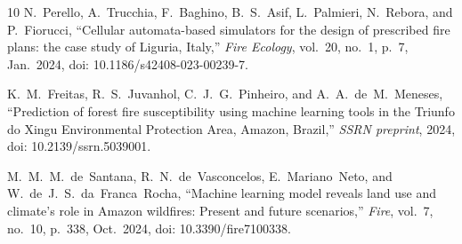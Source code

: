 \documentclass[12pt,a4paper]{article}
\begin{document}
\begin{thebibliography}{10}
N.~Perello, A.~Trucchia, F.~Baghino, B.~S.~Asif, L.~Palmieri, N.~Rebora, and P.~Fiorucci,
``Cellular automata-based simulators for the design of prescribed fire plans: the case study of Liguria, Italy,''
\textit{Fire Ecology}, vol.~20, no.~1, p.~7, Jan.~2024,
doi: 10.1186/s42408-023-00239-7.

K.~M.~Freitas, R.~S.~Juvanhol, C.~J.~G.~Pinheiro, and A.~A.~de~M.~Meneses,
``Prediction of forest fire susceptibility using machine learning tools in the Triunfo do Xingu Environmental Protection Area, Amazon, Brazil,''
\textit{SSRN preprint}, 2024,
doi: 10.2139/ssrn.5039001.

M.~M.~M.~de~Santana, R.~N.~de~Vasconcelos, E.~Mariano~Neto, and W.~de~J.~S.~da~Franca~Rocha,
``Machine learning model reveals land use and climate's role in Amazon wildfires: Present and future scenarios,''
\textit{Fire}, vol.~7, no.~10, p.~338, Oct.~2024,
doi: 10.3390/fire7100338.

\end{thebibliography}
\end{document}
